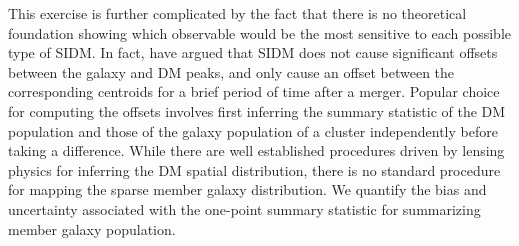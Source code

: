 This exercise is further complicated by the fact that there is no theoretical
foundation showing which observable would be the most sensitive to each
possible type of SIDM. In fact, \cite{Kahlhoefer14} have argued that SIDM 
does not cause
significant offsets between the galaxy and DM peaks, and only cause an offset
between the corresponding centroids for a brief period of time after a merger. 
Popular choice for computing the offsets involves first inferring the summary
statistic of the DM population and those of the galaxy population of a cluster
independently before taking a difference.
While there are well established procedures driven by lensing physics for 
inferring the DM spatial distribution, there is no standard procedure for
mapping the sparse member galaxy distribution. 
We quantify the bias and uncertainty associated with the one-point summary
statistic for summarizing member galaxy population. 
% 
% 
% 

